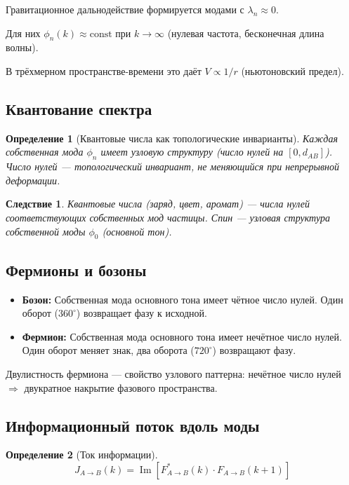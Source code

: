\documentclass[11pt,a4paper]{article}
\newtheorem{definition}{Определение}[section]
\newtheorem{corollary}{Следствие}[section]
\theoremstyle{definition}
\begin{document}
Гравитационное дальнодействие формируется модами с $\lambda_n \approx 0$.

Для них $\phi_n(k) \approx \text{const}$ при $k \to \infty$ (нулевая частота, бесконечная длина волны).

В трёхмерном пространстве-времени это даёт $V \propto 1/r$ (ньютоновский предел).

\subsection{Квантование спектра}

\begin{definition}[Квантовые числа как топологические инварианты]
Каждая собственная мода $\phi_n$ имеет узловую структуру (число нулей на $[0, d_{AB}]$). Число нулей --- топологический инвариант, не меняющийся при непрерывной деформации.
\end{definition}

\begin{corollary}
Квантовые числа (заряд, цвет, аромат) --- числа нулей соответствующих собственных мод частицы. Спин --- узловая структура собственной моды $\phi_0$ (основной тон).
\end{corollary}

\subsection{Фермионы и бозоны}

\begin{itemize}
    \item \textbf{Бозон:} Собственная мода основного тона имеет чётное число нулей. Один оборот ($360^\circ$) возвращает фазу к исходной.
    \item \textbf{Фермион:} Собственная мода основного тона имеет нечётное число нулей. Один оборот меняет знак, два оборота ($720^\circ$) возвращают фазу.
\end{itemize}

Двулистность фермиона --- свойство узлового паттерна: нечётное число нулей $\Rightarrow$ двукратное накрытие фазового пространства.

\subsection{Информационный поток вдоль моды}

\begin{definition}[Ток информации]
\begin{equation}
    J_{A \to B}(k) = \operatorname{Im}\left[ F_{A \to B}^*(k) \cdot F_{A \to B}(k+1) \right]
\end{equation}
\end{definition}
\end{document}

